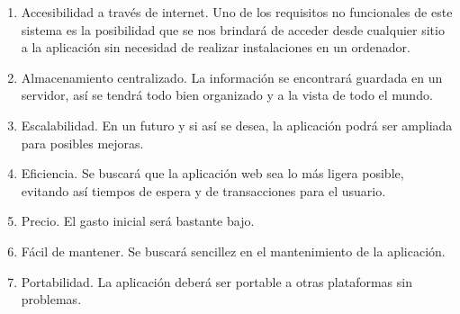 \begin{enumerate}
    \item Accesibilidad a través de internet. Uno de los requisitos no
        funcionales de este sistema es la posibilidad que se nos brindará de
        acceder desde cualquier sitio a la aplicación sin necesidad de realizar
        instalaciones en un ordenador.
    \item Almacenamiento centralizado. La información se encontrará guardada en
        un servidor, así se tendrá todo bien organizado y a la vista de todo el
        mundo.
    \item Escalabilidad. En un futuro y si así se desea, la aplicación podrá
        ser ampliada para posibles mejoras.
    \item Eficiencia. Se buscará que la aplicación web sea lo más ligera
        posible, evitando así tiempos de espera y de transacciones para el
        usuario.
    \item Precio. El gasto inicial será bastante bajo.
    \item Fácil de mantener. Se buscará sencillez en el mantenimiento de la
        aplicación.
    \item Portabilidad. La aplicación deberá ser portable a otras plataformas
        sin problemas.
\end{enumerate}
